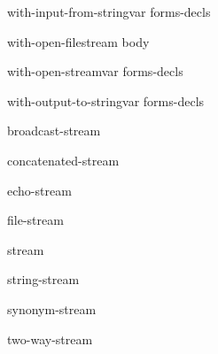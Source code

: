 \begin{macro}{with-input-from-string}{var \body forms-decls}{}{}
  
\end{macro}

\begin{macro}{with-open-file}{stream \body body}{}{}
  
\end{macro}

\begin{macro}{with-open-stream}{var \body forms-decls}{}{}
  
\end{macro}

\begin{macro}{with-output-to-string}{var \body forms-decls}{}{}
  
\end{macro}

\begin{class}{broadcast-stream}{}{}{}
  
\end{class}

\begin{class}{concatenated-stream}{}{}{}
  
\end{class}

\begin{class}{echo-stream}{}{}{}
  
\end{class}

\begin{class}{file-stream}{}{}{}
  
\end{class}

\begin{class}{stream}{}{}{}
  
\end{class}

\begin{class}{string-stream}{}{}{}
  
\end{class}

\begin{class}{synonym-stream}{}{}{}
  
\end{class}

\begin{class}{two-way-stream}{}{}{}
  
\end{class}

